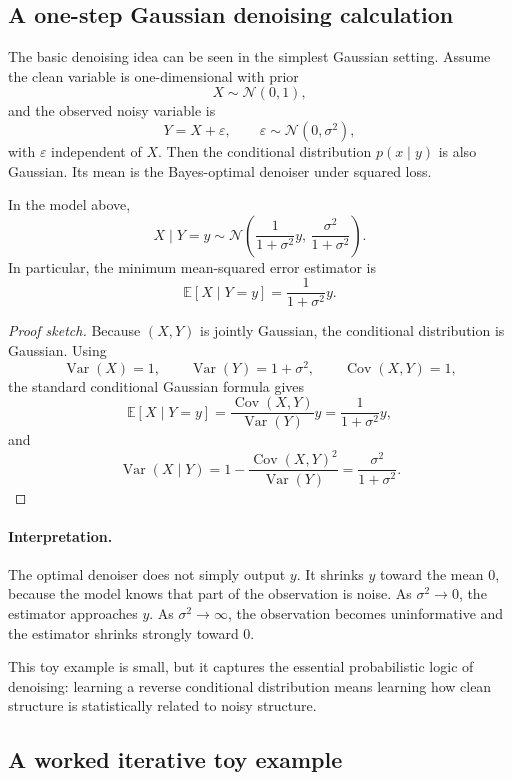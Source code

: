 \subsection*{A one-step Gaussian denoising calculation}

The basic denoising idea can be seen in the simplest Gaussian setting.
Assume the clean variable is one-dimensional with prior
\[
X\sim \mathcal{N}(0,1),
\]
and the observed noisy variable is
\[
Y=X+\varepsilon,
\qquad \varepsilon\sim \mathcal{N}(0,\sigma^2),
\]
with $\varepsilon$ independent of $X$.
Then the conditional distribution $p(x\mid y)$ is also Gaussian.
Its mean is the Bayes-optimal denoiser under squared loss.

\begin{proposition}
In the model above,
\[
X\mid Y=y \sim \mathcal{N}\!\left(\frac{1}{1+\sigma^2}y,\,\frac{\sigma^2}{1+\sigma^2}\right).
\]
In particular, the minimum mean-squared error estimator is
\[
\mathbb{E}[X\mid Y=y]=\frac{1}{1+\sigma^2}y.
\]
\end{proposition}

\begin{proof}[Proof sketch]
Because $(X,Y)$ is jointly Gaussian, the conditional distribution is Gaussian.
Using
\[
\operatorname{Var}(X)=1,
\qquad
\operatorname{Var}(Y)=1+\sigma^2,
\qquad
\operatorname{Cov}(X,Y)=1,
\]
the standard conditional Gaussian formula gives
\[
\mathbb{E}[X\mid Y=y]
=
\frac{\operatorname{Cov}(X,Y)}{\operatorname{Var}(Y)}y
=
\frac{1}{1+\sigma^2}y,
\]
and
\[
\operatorname{Var}(X\mid Y)
=
1-\frac{\operatorname{Cov}(X,Y)^2}{\operatorname{Var}(Y)}
=
\frac{\sigma^2}{1+\sigma^2}.
\]
\end{proof}

\paragraph{Interpretation.}
The optimal denoiser does not simply output $y$.
It shrinks $y$ toward the mean $0$, because the model knows that part of the observation is noise.
As $\sigma^2\to 0$, the estimator approaches $y$.
As $\sigma^2\to \infty$, the observation becomes uninformative and the estimator shrinks strongly toward $0$.

This toy example is small, but it captures the essential probabilistic logic of denoising:
learning a reverse conditional distribution means learning how clean structure is statistically related to noisy structure.

\subsection*{A worked iterative toy example}

